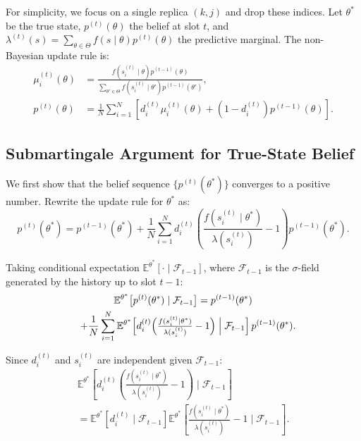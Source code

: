 \documentclass[journal]{IEEEtran}
\theoremstyle{plain}
\theoremstyle{definition}
\theoremstyle{remark}
\begin{document}
For simplicity, we focus on a single replica $(k,j)$ and drop these indices. Let $\theta^*$ be the true state, $p^{(t)}(\theta)$ the belief at slot $t$, and $\lambda^{(t)}(s) = \sum_{\theta \in \Theta} f(s \mid \theta) p^{(t)}(\theta)$ the predictive marginal. The non-Bayesian update rule is:
\begin{align}
\mu_i^{(t)}(\theta) &= \frac{f(s_i^{(t)} \mid \theta) p^{(t-1)}(\theta)}{\sum_{\theta' \in \Theta} f(s_i^{(t)} \mid \theta') p^{(t-1)}(\theta')}, \label{eq:intermediate} \\
p^{(t)}(\theta) &= \frac{1}{N} \sum_{i=1}^N \left[ d_i^{(t)} \mu_i^{(t)}(\theta) + (1 - d_i^{(t)}) p^{(t-1)}(\theta) \right]. \label{eq:nonbayes_update}
\end{align}

\subsection{Submartingale Argument for True-State Belief}
\label{app:proof_thm3_sec2}

We first show that the belief sequence $\{p^{(t)}(\theta^*)\}$ converges to a positive number. Rewrite the update rule for $\theta^*$ as:
\begin{equation}
p^{(t)}(\theta^*) = p^{(t-1)}(\theta^*) + \frac{1}{N} \sum_{i=1}^N d_i^{(t)} \left( \frac{f(s_i^{(t)} \mid \theta^*)}{\lambda(s_i^{(t)})} - 1 \right) p^{(t-1)}(\theta^*). \label{eq:belief_update}
\end{equation}

Taking conditional expectation $\mathbb{E}^{\theta^*}[\cdot \mid \mathcal{F}_{t-1}]$, where $\mathcal{F}_{t-1}$ is the $\sigma$-field generated by the history up to slot $t-1$:
\begin{multline}
\mathbb{E}^{\theta^*}\big[p^{(t)}(\theta^*) \mid \mathcal{F}_{t-1}\big]
= p^{(t-1)}(\theta^*) \\
\quad + \frac{1}{N}
\sum_{i=1}^N
\mathbb{E}^{\theta^*}\Big[
d_i^{(t)}\Big(\tfrac{f(s_i^{(t)}\mid\theta^*)}{\lambda(s_i^{(t)})}-1\Big)
\Bigm|\mathcal{F}_{t-1}\Big]\,p^{(t-1)}(\theta^*).
\label{eq:conditional_expectation}
\end{multline}



Since $d_i^{(t)}$ and $s_i^{(t)}$ are independent given $\mathcal{F}_{t-1}$:
\begin{multline}
\mathbb{E}^{\theta^*}\left[d_i^{(t)} \left( \frac{f(s_i^{(t)} \mid \theta^*)}{\lambda(s_i^{(t)})} - 1 \right) \mid \mathcal{F}_{t-1}\right] \\
= \mathbb{E}^{\theta^*}\left[d_i^{(t)} \mid \mathcal{F}_{t-1}\right]
\mathbb{E}^{\theta^*}\left[ \frac{f(s_i^{(t)} \mid \theta^*)}{\lambda(s_i^{(t)})} - 1 \mid \mathcal{F}_{t-1}\right].
\end{multline}
\end{document}
